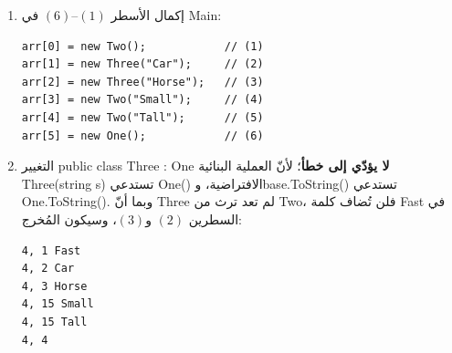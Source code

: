 \def\bagrutTocEntry{\phantomsection\addcontentsline{toc}{subsection}{\texorpdfstring{سؤال $11$ امتحان $\mathrm{899271}$ سنة $2025$}{سؤال 11 امتحان 899271 سنة 2025}}\global\let\bagrutTocEntry\relax}%



\ifwithsols
\begin{boxSolution}
\begin{enumerate}[label=\textbf{\alph*.}, itemsep=0.8em]
    \item إكمال الأسطر $(1)$–$(6)$ في \textenglish{Main}:
\begin{boxCode}
\begin{english}
\begin{verbatim}
arr[0] = new Two();            // (1)
arr[1] = new Three("Car");     // (2)
arr[2] = new Three("Horse");   // (3)
arr[3] = new Two("Small");     // (4)
arr[4] = new Two("Tall");      // (5)
arr[5] = new One();            // (6)
\end{verbatim}
\end{english}
\end{boxCode}

    \item التغيير \textenglish{public class Three : One} \textbf{لا يؤدّي إلى خطأ}؛ لأنّ العملية البنائية \textenglish{Three(string s)} تستدعي \textenglish{One()} الافتراضية، و\textenglish{base.ToString()} تستدعي \textenglish{One.ToString()}. وبما أنّ \textenglish{Three} لم تعد ترث من \textenglish{Two}، فلن تُضاف كلمة \textenglish{Fast} في السطرين $(2)$ و$(3)$، وسيكون المُخرج:
\begin{boxCode}
\begin{english}
\begin{verbatim}
4, 1 Fast
4, 2 Car
4, 3 Horse
4, 15 Small
4, 15 Tall
4, 4
\end{verbatim}
\end{english}
\end{boxCode}
\end{enumerate}
\end{boxSolution}
\fi
\filbreak
